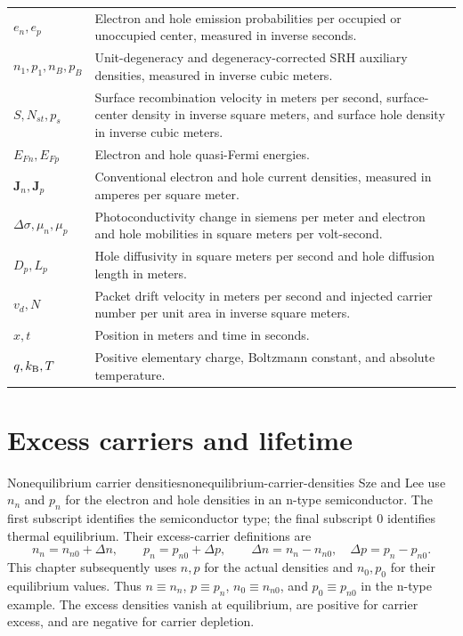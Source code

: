 \begin{center}
\begin{tabularx}{\textwidth}{@{}lX@{}}
$e_n,e_p$ & Electron and hole emission probabilities per occupied or unoccupied center, measured in inverse seconds. \\
$n_1,p_1,n_B,p_B$ & Unit-degeneracy and degeneracy-corrected SRH auxiliary densities, measured in inverse cubic meters. \\
$S,N_{st},p_s$ & Surface recombination velocity in meters per second, surface-center density in inverse square meters, and surface hole density in inverse cubic meters. \\
$E_{Fn},E_{Fp}$ & Electron and hole quasi-Fermi energies. \\
$\bm J_n,\bm J_p$ & Conventional electron and hole current densities, measured in amperes per square meter. \\
$\Delta\sigma,\mu_n,\mu_p$ & Photoconductivity change in siemens per meter and electron and hole mobilities in square meters per volt-second. \\
$D_p,L_p$ & Hole diffusivity in square meters per second and hole diffusion length in meters. \\
$v_d,N$ & Packet drift velocity in meters per second and injected carrier number per unit area in inverse square meters. \\
$x,t$ & Position in meters and time in seconds. \\
$q,k_{\mathrm B},T$ & Positive elementary charge, Boltzmann constant, and absolute temperature. \\
\bottomrule
\end{tabularx}
\end{center}

\section{Excess carriers and lifetime}

\begin{definition}{Nonequilibrium carrier densities}{nonequilibrium-carrier-densities}
Sze and Lee use $n_n$ and $p_n$ for the electron and hole densities in an
n-type semiconductor.  The first subscript identifies the semiconductor type;
the final subscript $0$ identifies thermal equilibrium.  Their excess-carrier
definitions are \cite[Sec.~2.3.1, Eqs.~(36) and (38)]{szeLee2012}
\begin{equation}
  \boxed{
  n_n=n_{n0}+\Delta n,
  \qquad
  p_n=p_{n0}+\Delta p,
  }
  \qquad
  \Delta n=n_n-n_{n0},
  \quad
  \Delta p=p_n-p_{n0}.
  \label{eq:excess-carrier-definitions}
\end{equation}
This chapter subsequently uses $n,p$ for the actual densities and $n_0,p_0$
for their equilibrium values.  Thus $n\equiv n_n$, $p\equiv p_n$,
$n_0\equiv n_{n0}$, and $p_0\equiv p_{n0}$ in the n-type example.  The excess
densities vanish at equilibrium, are positive for carrier excess, and are
negative for carrier depletion.
\end{definition}

